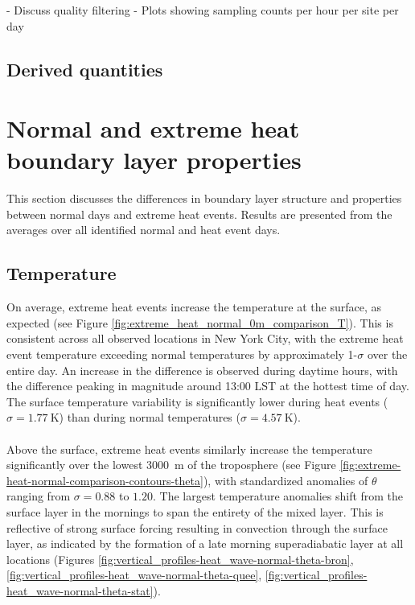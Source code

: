 \documentclass[11pt,a4paper]{article}
\begin{document}
- Discuss quality filtering
- Plots showing sampling counts per hour per site per day


\subsection{Derived quantities}
\section{Normal and extreme heat boundary layer properties}
This section discusses the differences in boundary layer structure and properties between normal days and extreme heat events. Results are presented from the averages over all identified normal and heat event days.

\subsection{Temperature}
On average, extreme heat events increase the temperature at the surface, as expected (see Figure \ref{fig:extreme_heat_normal_0m_comparison_T}). This is consistent across all observed locations in New York City, with the extreme heat event temperature exceeding normal temperatures by approximately 1-$\sigma$ over the entire day. An increase in the difference is observed during daytime hours, with the difference peaking in magnitude around 13:00 LST at the hottest time of day. The surface temperature variability is significantly lower during heat events ($ \sigma = \SI{1.77}{\kelvin} $) than during normal temperatures ($ \sigma = \SI{4.57}{\kelvin} $).
\\ \\
Above the surface, extreme heat events similarly increase the temperature significantly over the lowest \SI{3000}{\meter} of the troposphere (see Figure \ref{fig:extreme-heat-normal-comparison-contours-theta}), with standardized anomalies of $\theta$ ranging from $\sigma = 0.88$ to $1.20$. The largest temperature anomalies shift from the surface layer in the mornings to span the entirety of the mixed layer. This is reflective of strong surface forcing resulting in convection through the surface layer, as indicated by the formation of a late morning superadiabatic layer at all locations (Figures \ref{fig:vertical_profiles-heat_wave-normal-theta-bron}, \ref{fig:vertical_profiles-heat_wave-normal-theta-quee}, \ref{fig:vertical_profiles-heat_wave-normal-theta-stat}). 
\\ \\
\end{document}
